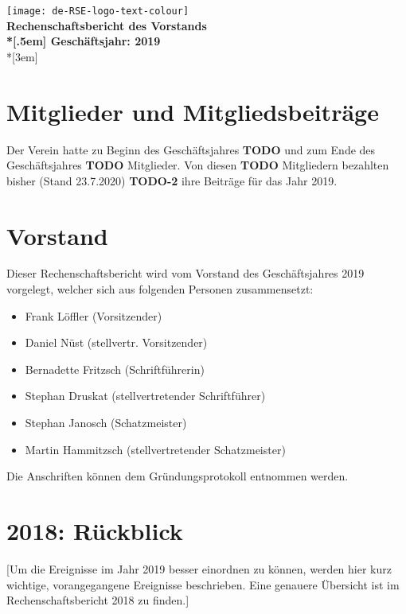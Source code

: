 \newcommand{\jahr}{2019}



\thispagestyle{empty}

\begin{centering}
\texttt{[image: de-RSE-logo-text-colour]}\\
\vspace{3em}
\textbf{
 \Large Rechenschaftsbericht des Vorstands\\*[.5em]
 \normalsize Geschäftsjahr: \jahr}\\*[3em]
\end{centering}

\section{Mitglieder und Mitgliedsbeiträge}

Der Verein hatte zu Beginn des Geschäftsjahres \textbf{TODO} und zum Ende des Geschäftsjahres \textbf{TODO} Mitglieder. Von diesen \textbf{TODO} Mitgliedern bezahlten bisher (Stand 23.7.2020) \textbf{TODO-2} ihre Beiträge für das Jahr 2019.

\section{Vorstand}

Dieser Rechenschaftsbericht wird vom Vorstand des Geschäftsjahres 2019 vorgelegt, welcher sich aus folgenden Personen zusammensetzt:

\begin{itemize}
  \setlength{\itemsep}{0pt plus 1pt}
  \item Frank Löffler (Vorsitzender)
  \item Daniel Nüst (stellvertr. Vorsitzender)
  \item Bernadette Fritzsch (Schriftführerin)
  \item Stephan Druskat (stellvertretender Schriftführer)
  \item Stephan Janosch (Schatzmeister)
  \item Martin Hammitzsch (stellvertretender Schatzmeister)
\end{itemize}

Die Anschriften können dem Gründungsprotokoll entnommen werden.

\section{2018: Rückblick}

[Um die Ereignisse im Jahr 2019 besser einordnen zu können, werden hier kurz wichtige,
vorangegangene Ereignisse beschrieben. Eine genauere Übersicht ist im Rechenschaftsbericht
2018 zu finden.]

